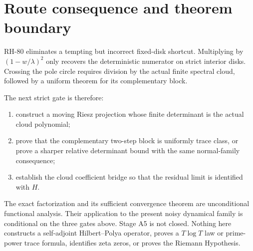 \documentclass[11pt]{article}
\theoremstyle{remark}
\begin{document}
\section{Route consequence and theorem boundary}

RH-80 eliminates a tempting but incorrect fixed-disk shortcut.  Multiplying
by $(1-w/\lambda)^2$ only recovers the deterministic numerator on strict
interior disks.  Crossing the pole circle requires division by the actual
finite spectral cloud, followed by a uniform theorem for its complementary
block.

The next strict gate is therefore:
\begin{enumerate}[leftmargin=2em]
 \item construct a moving Riesz projection whose finite determinant is the
 actual cloud polynomial;
 \item prove that the complementary two-step block is uniformly trace class,
 or prove a sharper relative determinant bound with the same normal-family
 consequence;
 \item establish the cloud coefficient bridge so that the residual limit is
 identified with $H$.
\end{enumerate}

The exact factorization and its sufficient convergence theorem are
unconditional functional analysis.  Their application to the present noisy
dynamical family is conditional on the three gates above.  Stage A5 is not
closed.  Nothing here constructs a self-adjoint Hilbert--Polya operator,
proves a $T\log T$ law or prime-power trace formula, identifies zeta zeros, or
proves the Riemann Hypothesis.



\end{document}
